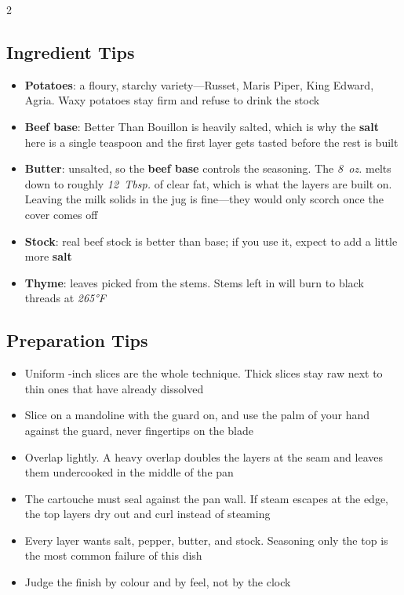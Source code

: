 \documentclass[11pt,letterpaper]{article}
\begin{document}
{\begin{multicols}{2}
\subsection*{Ingredient Tips}
\begin{itemize}
    \item \textbf{Potatoes}: a floury, starchy variety---Russet, Maris Piper, King Edward, Agria. Waxy potatoes stay firm and refuse to drink the stock
    \item \textbf{Beef base}: Better Than Bouillon is heavily salted, which is why the \textbf{salt} here is a single teaspoon and the first layer gets tasted before the rest is built
    \item \textbf{Butter}: unsalted, so the \textbf{beef base} controls the seasoning. The \textit{8~oz.} melts down to roughly \textit{12~Tbsp.} of clear fat, which is what the layers are built on. Leaving the milk solids in the jug is fine---they would only scorch once the cover comes off
    \item \textbf{Stock}: real beef stock is better than base; if you use it, expect to add a little more \textbf{salt}
    \item \textbf{Thyme}: leaves picked from the stems. Stems left in will burn to black threads at \textit{265°F}
\end{itemize}

\subsection*{Preparation Tips}
\begin{itemize}
    \item Uniform -inch slices are the whole technique. Thick slices stay raw next to thin ones that have already dissolved
    \item Slice on a mandoline with the guard on, and use the palm of your hand against the guard, never fingertips on the blade
    \item Overlap lightly. A heavy overlap doubles the layers at the seam and leaves them undercooked in the middle of the pan
    \item The cartouche must seal against the pan wall. If steam escapes at the edge, the top layers dry out and curl instead of steaming
    \item Every layer wants salt, pepper, butter, and stock. Seasoning only the top is the most common failure of this dish
    \item Judge the finish by colour and by feel, not by the clock
\end{itemize}


\end{multicols}}
\end{document}
